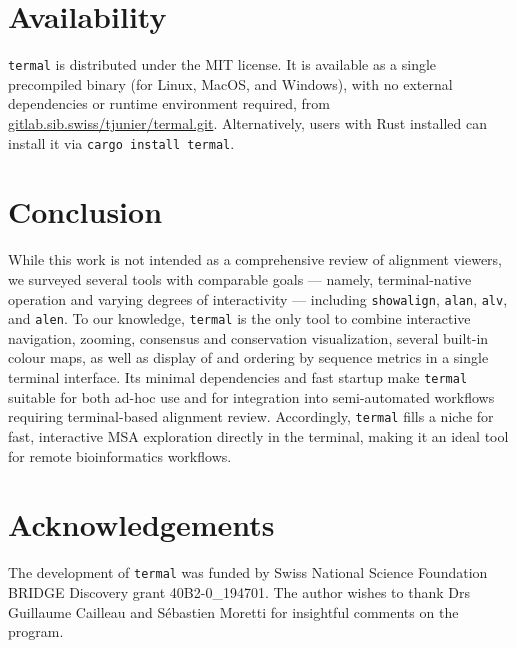 \documentclass[11pt]{article}
\begin{document}
\section*{Availability}

\texttt{termal} is distributed under the MIT license. It is available as a
single precompiled binary (for Linux, MacOS, and Windows), with no external
dependencies or runtime environment required, from
\url{gitlab.sib.swiss/tjunier/termal.git}. Alternatively, users with Rust
installed can install it via \texttt{cargo install termal}.

\section*{Conclusion}

While this work is not intended as a comprehensive review of alignment viewers,
we surveyed several tools with comparable goals — namely, terminal-native
operation and varying degrees of interactivity — including \texttt{showalign},
\texttt{alan}, \texttt{alv}, and \texttt{alen}.  To our knowledge,
\texttt{termal} is the only tool to combine interactive navigation, zooming,
consensus and conservation visualization, several built-in colour maps, as well
as display of and ordering by sequence metrics in a single terminal interface.
Its minimal dependencies and fast startup make \texttt{termal} suitable for both
ad-hoc use and for integration into semi-automated workflows requiring
terminal-based alignment review. Accordingly, \texttt{termal} fills a niche for
fast, interactive MSA exploration directly in the terminal, making it an ideal
tool for remote bioinformatics workflows.

\section*{Acknowledgements}

The development of \texttt{termal} was funded by Swiss National Science
Foundation BRIDGE Discovery grant 40B2-0\_194701.  The author wishes to thank
Drs Guillaume Cailleau and Sébastien Moretti for insightful comments on the
program.


\end{document}
